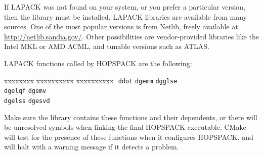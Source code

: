 If LAPACK was not found on your system, or you prefer a particular version,
then the library must be installed.  LAPACK libraries are available from
many sources.
One of the most popular versions is from Netlib, freely available at
\href{http://netlib.sandia.gov/}{http://netlib.sandia.gov/}.
Other possibilities are vendor-provided libraries like the Intel MKL or
AMD ACML, and tunable versions such as ATLAS.

LAPACK functions called by HOPSPACK are the following:
\vspace{-11pt}
\begin{tabbing}
  xxxxxxxx \= xxxxxxxxxx \= xxxxxxxxxx \= \kill
  \> {\tt ddot}   \> {\tt dgemm}   \> {\tt dgglse} \\
  \> {\tt dgelqf} \> {\tt dgemv}                   \\
  \> {\tt dgelss} \> {\tt dgesvd}
\end{tabbing}
\vspace{-11pt}
Make sure the library contains these functions and their dependents, or there
will be unresolved symbols when linking the final HOPSPACK executable.
CMake will test for the presence of these functions when it
configures HOPSPACK, and will halt with a warning message if it detects
a problem.

